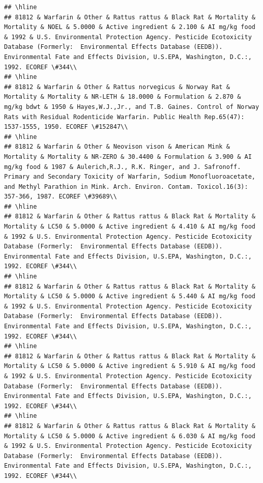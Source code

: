 \documentclass[12pt,]{article}
\begin{document}
\begin{verbatim}
## \hline
## 81812 & Warfarin & Other & Rattus rattus & Black Rat & Mortality & Mortality & NOEL & 5.0000 & Active ingredient & 2.100 & AI mg/kg food & 1992 & U.S. Environmental Protection Agency. Pesticide Ecotoxicity Database (Formerly:  Environmental Effects Database (EEDB)). Environmental Fate and Effects Division, U.S.EPA, Washington, D.C.:, 1992. ECOREF \#344\\
## \hline
## 81812 & Warfarin & Other & Rattus norvegicus & Norway Rat & Mortality & Mortality & NR-LETH & 18.0000 & Formulation & 2.870 & mg/kg bdwt & 1950 & Hayes,W.J.,Jr., and T.B. Gaines. Control of Norway Rats with Residual Rodenticide Warfarin. Public Health Rep.65(47): 1537-1555, 1950. ECOREF \#152847\\
## \hline
## 81812 & Warfarin & Other & Neovison vison & American Mink & Mortality & Mortality & NR-ZERO & 30.4400 & Formulation & 3.900 & AI mg/kg food & 1987 & Aulerich,R.J., R.K. Ringer, and J. Safronoff. Primary and Secondary Toxicity of Warfarin, Sodium Monofluoroacetate, and Methyl Parathion in Mink. Arch. Environ. Contam. Toxicol.16(3): 357-366, 1987. ECOREF \#39689\\
## \hline
## 81812 & Warfarin & Other & Rattus rattus & Black Rat & Mortality & Mortality & LC50 & 5.0000 & Active ingredient & 4.410 & AI mg/kg food & 1992 & U.S. Environmental Protection Agency. Pesticide Ecotoxicity Database (Formerly:  Environmental Effects Database (EEDB)). Environmental Fate and Effects Division, U.S.EPA, Washington, D.C.:, 1992. ECOREF \#344\\
## \hline
## 81812 & Warfarin & Other & Rattus rattus & Black Rat & Mortality & Mortality & LC50 & 5.0000 & Active ingredient & 5.440 & AI mg/kg food & 1992 & U.S. Environmental Protection Agency. Pesticide Ecotoxicity Database (Formerly:  Environmental Effects Database (EEDB)). Environmental Fate and Effects Division, U.S.EPA, Washington, D.C.:, 1992. ECOREF \#344\\
## \hline
## 81812 & Warfarin & Other & Rattus rattus & Black Rat & Mortality & Mortality & LC50 & 5.0000 & Active ingredient & 5.910 & AI mg/kg food & 1992 & U.S. Environmental Protection Agency. Pesticide Ecotoxicity Database (Formerly:  Environmental Effects Database (EEDB)). Environmental Fate and Effects Division, U.S.EPA, Washington, D.C.:, 1992. ECOREF \#344\\
## \hline
## 81812 & Warfarin & Other & Rattus rattus & Black Rat & Mortality & Mortality & LC50 & 5.0000 & Active ingredient & 6.030 & AI mg/kg food & 1992 & U.S. Environmental Protection Agency. Pesticide Ecotoxicity Database (Formerly:  Environmental Effects Database (EEDB)). Environmental Fate and Effects Division, U.S.EPA, Washington, D.C.:, 1992. ECOREF \#344\\

\end{verbatim}
\end{document}
